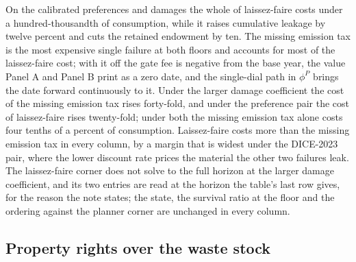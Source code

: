  On the calibrated preferences and damages the whole of laissez-faire costs under a hundred-thousandth of consumption, while it raises cumulative leakage by twelve percent and cuts the retained endowment by ten. The missing emission tax is the most expensive single failure at both floors and accounts for most of the laissez-faire cost; with it off the gate fee is negative from the base year, the value Panel A and Panel B print as a zero date, and the single-dial path in $\phi^P$ brings the date forward continuously to it. Under the larger damage coefficient the cost of the missing emission tax rises forty-fold, and under the preference pair the cost of laissez-faire rises twenty-fold; under both the missing emission tax alone costs four tenths of a percent of consumption. Laissez-faire costs more than the missing emission tax in every column, by a margin that is widest under the DICE-2023 pair, where the lower discount rate prices the material the other two failures leak. The laissez-faire corner does not solve to the full horizon at the larger damage coefficient, and its two entries are read at the horizon the table's last row gives, for the reason the note states; the state, the survival ratio at the floor and the ordering against the planner corner are unchanged in every column.

\subsection{Property rights over the waste stock}\label{sec:q:res:gatefee}

